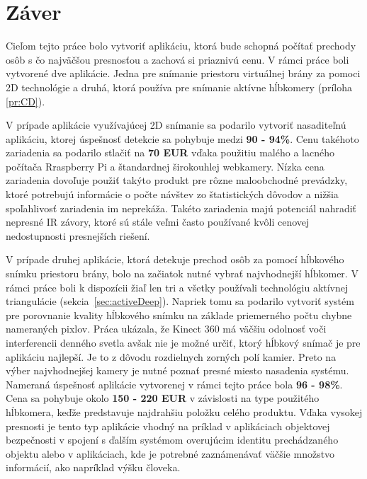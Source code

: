 
\chapter{Záver}
Cieľom tejto práce bolo vytvoriť aplikáciu, ktorá bude schopná počítať prechody osôb s čo najväčšou presnosťou a zachová si  priaznivú cenu. V rámci práce boli vytvorené dve aplikácie. Jedna pre snímanie priestoru virtuálnej brány za pomoci 2D technológie a druhá, ktorá používa pre snímanie aktívne hĺbkomery (príloha \ref{pr:CD}).

V prípade aplikácie využívajúcej 2D snímanie sa podarilo vytvoriť nasaditeľnú aplikáciu, ktorej úspešnosť detekcie sa pohybuje medzi \textbf{90 - 94\%}. Cenu takéhoto zariadenia sa podarilo stlačiť na \textbf{70 EUR} vďaka použitiu malého a lacného počítača Rraspberry Pi a štandardnej širokouhlej webkamery. Nízka cena zariadenia dovoľuje použiť takýto produkt pre rôzne maloobchodné prevádzky, ktoré potrebujú informácie o počte návštev zo štatistických dôvodov a nižšia spoľahlivosť zariadenia im neprekáža. Takéto zariadenia majú potenciál nahradiť nepresné IR závory, ktoré sú stále veľmi často používané kvôli cenovej nedostupnosti presnejších riešení.

V prípade druhej aplikácie, ktorá detekuje prechod osôb za pomocí hĺbkového snímku priestoru brány, bolo na začiatok nutné vybrať najvhodnejší hĺbkomer. V rámci práce boli k dispozícii žiaľ len tri a všetky používali technológiu aktívnej triangulácie (sekcia~\ref{sec:activeDeep}). Napriek tomu sa podarilo vytvoriť systém pre porovnanie kvality hĺbkového snímku na základe priemerného počtu chybne nameraných pixlov. Práca ukázala, že Kinect 360 má väčšiu odolnosť voči interferencii denného svetla avšak nie je možné určiť, ktorý hĺbkový snímač je pre aplikáciu najlepší. Je to z dôvodu rozdielnych zorných polí kamier. Preto na výber najvhodnejšej kamery je nutné poznať presné miesto nasadenia systému. Nameraná úspešnosť aplikácie vytvorenej v rámci tejto práce bola \textbf{96 - 98\%}. Cena sa pohybuje okolo \textbf{150 - 220 EUR} v závislosti na type použitého hĺbkomera, keďže predstavuje najdrahšiu položku celého produktu. Vďaka vysokej presnosti je tento typ aplikácie vhodný na príklad v aplikáciach objektovej bezpečnosti v spojení s ďalším systémom overujúcim identitu prechádzaného objektu alebo v aplikáciach, kde je potrebné zaznámenávať väčšie množstvo informácií, ako napríklad výšku človeka.

